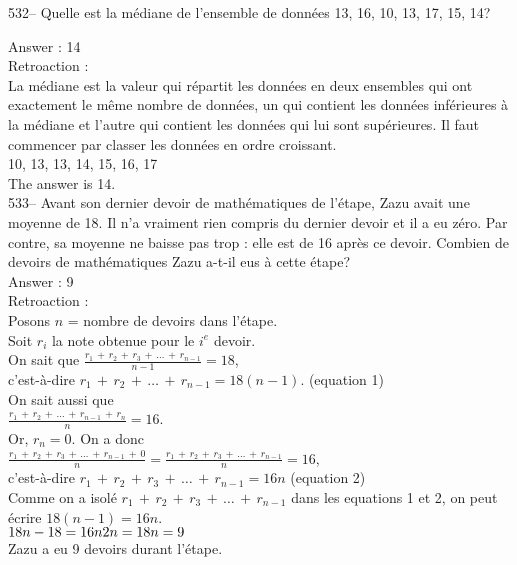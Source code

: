 ﻿\documentclass[letterpaper, 12pt]{article}
\begin{document}
532-- Quelle est la m\'ediane de l'ensemble de donn\'ees 13, 16, 10, 13, 17,
15, 14?

Answer : 14\\

Retroaction :\\
La m\'ediane est la valeur qui r\'epartit les donn\'ees en deux ensembles
qui ont exactement le m\^eme nombre de donn\'ees, un qui contient les
donn\'ees inf\'erieures \`a la m\'ediane et l'autre qui contient les
donn\'ees qui lui sont sup\'erieures.  Il faut commencer par classer les
donn\'ees en ordre croissant.\\
10, 13, 13, 14, 15, 16, 17 \\
The answer is 14.\\

533-- Avant son dernier devoir de math\'ematiques de l'\'etape, Zazu avait
une moyenne de 18.  Il n'a vraiment rien compris du dernier devoir et il a
eu z\'ero.  Par contre, sa moyenne ne baisse pas trop : elle est de 16
apr\`es ce devoir.  Combien de devoirs de math\'ematiques Zazu a-t-il eus
\`a cette \'etape?\\

Answer : 9\\

Retroaction : \\
Posons $n$ = nombre de devoirs dans l'\'etape.\\
Soit $r_i$ la note obtenue pour le $i^{e}$ devoir.\\[2mm]
On sait que
$\frac{r_{1}\,+\,r_{2}\,+\,r_{3}\,+\,\ldots\,+\,r_{n-1}}{n-1}=18$,\\[2mm]
c'est-\`a-dire $r_{1}\,+\,r_{2}\,+\,\ldots\,+\,r_{n-1} =18(n-1)$. \qquad
(equation 1)\\[2mm]
On sait aussi que \\[2mm]
$\frac{r_{1}\,+\,r_{2}\,+\,\ldots\,+\,r_{n-1}\,+\,r_{n}}{n}=16$.\\[2mm]
Or, $r_{n}=0$.  On a donc \\[2mm]
$\frac{r_{1}\,+\,r_{2}\,+\,r_{3}\,+\,\ldots\,+\,r_{n-1}\,+\,0}{n}=\frac{r_{1}\,+\,r_{2}\,+\,r_{3}\,+\,\ldots\,+\,r_{n-1}}{n}=16$,\\[2mm]
c'est-\`a-dire $r_{1}\,+\,r_{2}\,+\,r_{3}\,+\,\ldots\,+\,r_{n-1}=16n$ \qquad
(equation 2)\\[2mm]
Comme on a isol\'e
$r_{1}\,+\,r_{2}\,+\,r_{3}\,+\,\ldots\,+\,r_{n-1}$ dans les
equations 1 et 2,
on peut \'ecrire $18\left( n-1\right) = 16n$.\\
$18n-18=16n\\
2n=18\\
n=9$\\
Zazu a eu 9 devoirs durant l'\'etape.\\
\end{document}
